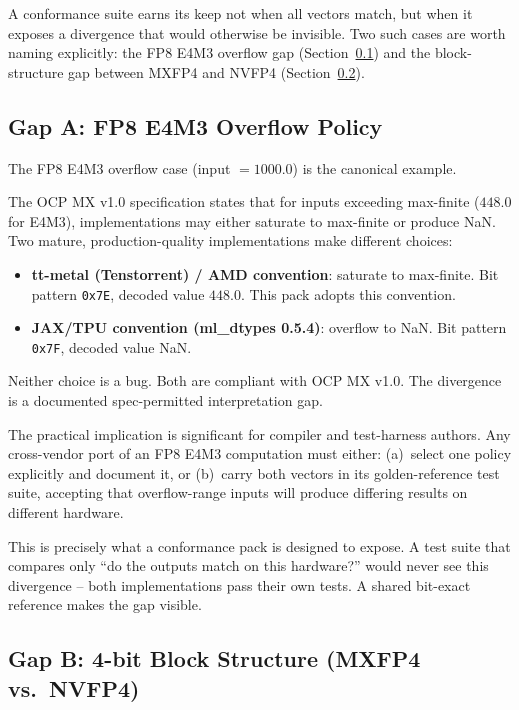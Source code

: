 \documentclass[11pt,letterpaper]{article}
\begin{document}
A conformance suite earns its keep not when all vectors match, but when it
exposes a divergence that would otherwise be invisible.  Two such cases are
worth naming explicitly: the FP8 E4M3 overflow gap (Section~\ref{sec:gap_e4m3})
and the block-structure gap between MXFP4 and NVFP4 (Section~\ref{sec:gap_4bit}).

\subsection{Gap A: FP8 E4M3 Overflow Policy}
\label{sec:gap_e4m3}

The FP8 E4M3 overflow case (input $= 1000.0$) is the canonical example.

The OCP MX v1.0 specification \cite{ocp_mx} states that for inputs exceeding
max-finite ($448.0$ for E4M3), implementations may either saturate to max-finite
or produce NaN.  Two mature, production-quality implementations make different
choices:

\begin{itemize}
  \item \textbf{tt-metal (Tenstorrent) / AMD convention}: saturate to
    max-finite.  Bit pattern \texttt{0x7E}, decoded value $448.0$.
    This pack adopts this convention.
  \item \textbf{JAX/TPU convention (ml\_dtypes 0.5.4)}: overflow to NaN.
    Bit pattern \texttt{0x7F}, decoded value NaN.
\end{itemize}

Neither choice is a bug.  Both are compliant with OCP MX v1.0.  The divergence
is a documented spec-permitted interpretation gap.

The practical implication is significant for compiler and test-harness
authors.  Any cross-vendor port of an FP8 E4M3 computation must either:
(a)~select one policy explicitly and document it, or
(b)~carry both vectors in its golden-reference test suite, accepting that
overflow-range inputs will produce differing results on different hardware.

This is precisely what a conformance pack is designed to expose.  A test suite
that compares only ``do the outputs match on this hardware?'' would never see
this divergence -- both implementations pass their own tests.  A shared bit-exact
reference makes the gap visible.

\subsection{Gap B: 4-bit Block Structure (MXFP4 vs.\ NVFP4)}
\label{sec:gap_4bit}
\end{document}

